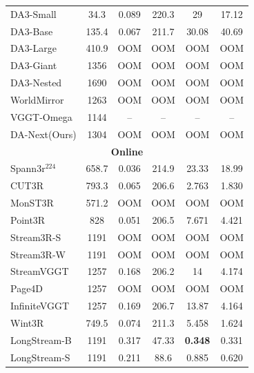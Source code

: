\documentclass{llmxive}
\providecommand{\ours}{DA-Next\xspace}
\begin{document}
\begin{table}[t]
{\begin{tabular}{l c >{\columncolor{subcol}}c >{\columncolor{subcol}}c >{\columncolor{subcol}}c >{\columncolor{subcol}}c}
 DA3-Small & 34.3 & 0.089 & 220.3 & 29 & 17.12 \\
 DA3-Base & 135.4 & 0.067 & 211.7 & 30.08 & 40.69 \\
 DA3-Large & 410.9 & \cellcolor{oomred}OOM & \cellcolor{oomred}OOM & \cellcolor{oomred}OOM & \cellcolor{oomred}OOM \\
 DA3-Giant & 1356 & \cellcolor{oomred}OOM & \cellcolor{oomred}OOM & \cellcolor{oomred}OOM & \cellcolor{oomred}OOM \\
 DA3-Nested & 1690 & \cellcolor{oomred}OOM & \cellcolor{oomred}OOM & \cellcolor{oomred}OOM & \cellcolor{oomred}OOM \\
 WorldMirror & 1263 & \cellcolor{oomred}OOM & \cellcolor{oomred}OOM & \cellcolor{oomred}OOM & \cellcolor{oomred}OOM \\
 VGGT-Omega & 1144 & -- & -- & -- & -- \\
 \ours (Ours) & 1304 & \cellcolor{oomred}OOM & \cellcolor{oomred}OOM & \cellcolor{oomred}OOM & \cellcolor{oomred}OOM \\
\midrule
\multicolumn{6}{c}{\cellcolor{catgray}\textbf{Online}} \\
\midrule
 Spann3r$^{224}$ & 658.7 & 0.036 & 214.9 & 23.33 & 18.99 \\
 CUT3R & 793.3 & 0.065 & 206.6 & 2.763 & 1.830 \\
 MonST3R & 571.2 & \cellcolor{oomred}OOM & \cellcolor{oomred}OOM & \cellcolor{oomred}OOM & \cellcolor{oomred}OOM \\
 Point3R & 828 & 0.051 & 206.5 & 7.671 & 4.421 \\
 Stream3R-S & 1191 & \cellcolor{oomred}OOM & \cellcolor{oomred}OOM & \cellcolor{oomred}OOM & \cellcolor{oomred}OOM \\
 Stream3R-W & 1191 & \cellcolor{oomred}OOM & \cellcolor{oomred}OOM & \cellcolor{oomred}OOM & \cellcolor{oomred}OOM \\
 StreamVGGT & 1257 & 0.168 & 206.2 & 14 & 4.174 \\
 Page4D & 1257 & \cellcolor{oomred}OOM & \cellcolor{oomred}OOM & \cellcolor{oomred}OOM & \cellcolor{oomred}OOM \\
 InfiniteVGGT & 1257 & 0.169 & 206.7 & 13.87 & 4.164 \\
 Wint3R & 749.5 & 0.074 & 211.3 & 5.458 & 1.624 \\
 LongStream-B & 1191 & 0.317 & 47.33 & \cellcolor{secondorange}\textbf{0.348} & 0.331 \\
 LongStream-S & 1191 & 0.211 & 88.6 & 0.885 & 0.620 \\

\end{tabular}}
\end{table}
\end{document}
